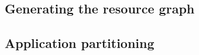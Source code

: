 \subsection{Generating the resource graph}
\label{sec:gener-reso-graph}


\subsection{Application partitioning}
\label{sec:appl-part}

